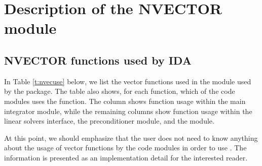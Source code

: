 \chapter{Description of the NVECTOR module}\label{s:nvector}



\section{NVECTOR functions used by IDA}

In Table \ref{t:nvecuse} below, we list the vector functions used in the
{\nvector} module used by the {\ida} package.
The table also shows, for each function, which of the code modules uses
the function. The {\ida} column shows function usage within the main
integrator module, while the remaining columns show function usage
within the {\idals} linear solvers interface, the {\idabbdpre}
preconditioner module, and the {\fida} module.

At this point, we should emphasize that the {\ida} user does not need to know
anything about the usage of vector functions by the {\ida} code modules in order
to use {\ida}. The information is presented as an implementation detail for the
interested reader.

